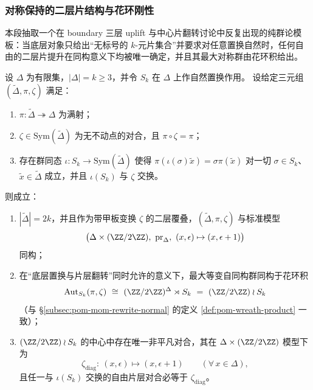 \subsubsection{对称保持的二层片结构与花环刚性}\label{subsubsec:bdry-layerlift-wreath-rigidity}

本段抽取一个在 boundary 三层 uplift 与中心片翻转讨论中反复出现的纯群论模板：当底层对象只给出“无标号的 \(k\)-元片集合”并要求对任意置换自然时，任何自由的二层片提升在同构意义下均被唯一确定，并且其最大对称群由花环积给出。

\begin{theorem}\label{thm:equivariant-z2-layerlift-wreath-rigidity}
设 \(\Delta\) 为有限集，\(|\Delta|=k\ge 3\)，并令 \(S_k\) 在 \(\Delta\) 上作自然置换作用。
设给定三元组 \((\widetilde\Delta,\pi,\zeta)\) 满足：
\begin{enumerate}
  \item \(\pi:\widetilde\Delta\twoheadrightarrow \Delta\) 为满射；
  \item \(\zeta\in\mathrm{Sym}(\widetilde\Delta)\) 为无不动点的对合，且 \(\pi\circ \zeta=\pi\)；
  \item 存在群同态 \(\iota:S_k\to\mathrm{Sym}(\widetilde\Delta)\) 使得 \(\pi(\iota(\sigma)\tilde x)=\sigma\pi(\tilde x)\) 对一切 \(\sigma\in S_k\)、\(\tilde x\in\widetilde\Delta\) 成立，并且 \(\iota(S_k)\) 与 \(\zeta\) 交换。
\end{enumerate}
则成立：
\begin{enumerate}
  \item \(|\widetilde\Delta|=2k\)，并且作为带甲板变换 \(\zeta\) 的二层覆叠，\((\widetilde\Delta,\pi,\zeta)\) 与标准模型
  \[
  \bigl(\Delta\times(\ZZ/2\ZZ),\ \mathrm{pr}_\Delta,\ (x,\epsilon)\mapsto(x,\epsilon+1)\bigr)
  \]
  同构；
  \item 在“底层置换与片层翻转”同时允许的意义下，最大等变自同构群同构于花环积
  \[
  \mathrm{Aut}_{S_k}(\pi,\zeta)\ \cong\ (\ZZ/2\ZZ)^{\Delta}\rtimes S_k\ =\ (\ZZ/2\ZZ)\wr S_k
  \]
  （与 \S\ref{subsec:pom-mom-rewrite-normal} 的定义 \ref{def:pom-wreath-product} 一致）；
  \item \((\ZZ/2\ZZ)\wr S_k\) 的中心中存在唯一非平凡对合，其在 \(\Delta\times(\ZZ/2\ZZ)\) 模型下为
  \[
  \zeta_{\mathrm{diag}}:\ (x,\epsilon)\longmapsto(x,\epsilon+1)\qquad(\forall\,x\in\Delta),
  \]
  且任一与 \(\iota(S_k)\) 交换的自由片层对合必等于 \(\zeta_{\mathrm{diag}}\)。
\end{enumerate}
\end{theorem}
